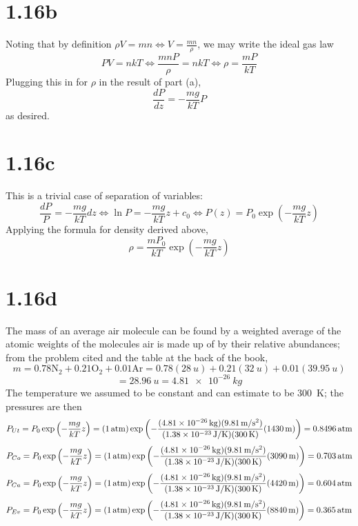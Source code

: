 \documentclass{article}
\begin{document}
\section*{1.16b}
Noting that by definition $\rho V=mn \Leftrightarrow V=\frac{mn}{\rho}$, we may write the ideal gas law
\[PV=nkT\Leftrightarrow \frac{mnP}{\rho}=nkT\Leftrightarrow \rho = \frac{mP}{kT}\]
Plugging this in for $\rho$ in the result of part (a),
\[\frac{dP}{dz}=-\frac{mg}{kT}P\]
as desired.

\section*{1.16c}
This is a trivial case of separation of variables:
\[\frac{dP}{P}=-\frac{mg}{kT}dz\Leftrightarrow \ln P=-\frac{mg}{kT}z+c_0\Leftrightarrow P(z)=P_0\exp\left( -\frac{mg}{kT}z \right)\]
Applying the formula for density derived above,
\[\rho=\frac{mP_0}{kT}\exp\left( -\frac{mg}{kT}z \right)\]

\section*{1.16d}
The mass of an average air molecule can be found by a weighted average of the atomic weights of the molecules air is made up of by their relative abundances; from the problem cited and the table at the back of the book,
\[m=0.78\textrm{N}_2+0.21\textrm{O}_2+0.01\textrm{Ar}=0.78(\SI{28}{u})+0.21(\SI{32}{u})+0.01(\SI{39.95}{u})\]
\[=\SI{28.96}{u}=\SI{4.81e-26}{kg}\]
The temperature we assumed to be constant and can estimate to be \SI{300}{K}; the pressures are then
\[P_{Ut}=P_0\exp\left( -\frac{mg}{kT}z \right)=(\SI{1}{atm})\exp\left( -\frac{(\SI{4.81E-26}{kg})(\SI{9.81}{m/s^2})}{(\SI{1.38E-23}{J/K})(\SI{300}{K})}(\SI{1430}{m}) \right)=\SI{0.8496}{atm}\]
\[P_{Co}=P_0\exp\left( -\frac{mg}{kT}z \right)=(\SI{1}{atm})\exp\left( -\frac{(\SI{4.81E-26}{kg})(\SI{9.81}{m/s^2})}{(\SI{1.38E-23}{J/K})(\SI{300}{K})}(\SI{3090}{m}) \right)=\SI{0.703}{atm}\]
\[P_{Ca}=P_0\exp\left( -\frac{mg}{kT}z \right)=(\SI{1}{atm})\exp\left( -\frac{(\SI{4.81E-26}{kg})(\SI{9.81}{m/s^2})}{(\SI{1.38E-23}{J/K})(\SI{300}{K})}(\SI{4420}{m}) \right)=\SI{0.604}{atm}\]
\[P_{Ev}=P_0\exp\left( -\frac{mg}{kT}z \right)=(\SI{1}{atm})\exp\left( -\frac{(\SI{4.81E-26}{kg})(\SI{9.81}{m/s^2})}{(\SI{1.38E-23}{J/K})(\SI{300}{K})}(\SI{8840}{m}) \right)=\SI{0.365}{atm}\]
\end{document}
